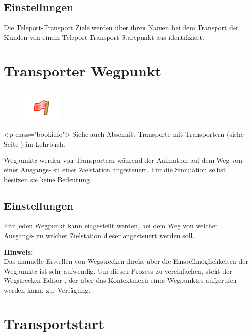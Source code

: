 \subsection*{Einstellungen}

Die Teleport-Transport Ziele werden über ihren Namen bei dem Transport der Kunden von
einem Teleport-Transport Startpunkt aus identifiziert.


\section{Transporter Wegpunkt}
\label{ref:ModelElementWayPoint}

\begin{figure}
\vspace{-22pt}
\includegraphics[width=2cm]{imageModelElementWayPoint.png}
\vspace{-22pt}
\end{figure}

<p class="bookinfo">
Siehe auch Abschnitt Transporte mit Transportern (siehe Seite \pageref{ref:book:8.3.2}) im Lehrbuch.

Wegpunkte werden von Transportern während der Animation auf dem Weg von einer Ausgangs-
zu einer Zielstation angesteuert. Für die Simulation selbst besitzen sie keine Bedeutung.

\subsection*{Einstellungen}

Für jeden Wegpunkt kann eingestellt werden, bei dem Weg von welcher Ausgangs- zu welcher
Zielstation dieser angesteuert werden soll.

\textbf{Hinweis:}~\\
Das manuelle Erstellen von Wegstrecken direkt über die Einstellmöglichkeiten der
Wegpunkte ist sehr aufwendig. Um diesen Prozess zu vereinfachen, steht der
Wegstrecken-Editor , der über das Kontextmenü
eines Wegpunktes aufgerufen werden kann, zur Verfügung.


\section{Transportstart}
\label{ref:ModelElementTransportSource}

